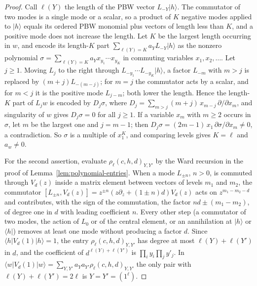 \documentclass[twoside,10pt]{article}
\numberwithin{equation}{section}
\theoremstyle{slbody}
\theoremstyle{definition}
\theoremstyle{remark}
\begin{document}
\begin{proof}
Call \(\ell(Y)\) the length of the PBW vector \(L_{-Y}\lvert h\rangle\).
The commutator of two modes is a single mode or a scalar, so a product of
\(K\) negative modes applied to \(\lvert h\rangle\) equals its ordered PBW
monomial plus vectors of length less than \(K\), and a positive mode does
not increase the length.  Let \(K\) be the largest length occurring in
\(w\), and encode its length-\(K\) part
\(\sum_{\ell(Y)=K}a_YL_{-Y}\lvert h\rangle\) as the nonzero polynomial
\(\sigma=\sum_{\ell(Y)=K}a_Yx_{y_1}\cdots x_{y_K}\) in commuting variables
\(x_1,x_2,\ldots\).  Let \(j\geq1\).  Moving \(L_j\) to the right through
\(L_{-y_1}\cdots L_{-y_K}\lvert h\rangle\), a factor \(L_{-m}\) with \(m>j\)
is replaced by \((m+j)L_{-(m-j)}\); for \(m=j\) the commutator acts by a
scalar, and for \(m<j\) it is the positive mode \(L_{j-m}\); both lower the
length.  Hence the length-\(K\) part of \(L_jw\) is encoded by
\(D_j\sigma\), where
\(D_j=\sum_{m>j}(m+j)\,x_{m-j}\,\partial/\partial x_m\), and singularity of
\(w\) gives \(D_j\sigma=0\) for all \(j\geq1\).  If a variable \(x_m\) with
\(m\geq2\) occurs in \(\sigma\), let \(m\) be the largest one and
\(j=m-1\); then \(D_j\sigma=(2m-1)\,x_1\,\partial\sigma/\partial x_m\neq0\),
a contradiction.  So \(\sigma\) is a multiple of \(x_1^K\), and comparing
levels gives \(K=\ell\) and \(a_w\neq0\).

For the second assertion, evaluate \(\rho_\ell(c,h,d)_{Y,Y'}\) by the Ward
recursion in the proof of Lemma~\ref{lem:polynomial-entries}.  When a mode
\(L_{\pm n}\), \(n>0\), is commuted through \(V_d(z)\) inside a matrix
element between vectors of levels \(m_1\) and \(m_2\), the commutator
\([L_{\pm n},V_d(z)]=z^{\pm n}(z\partial_z+(1\pm n)d)V_d(z)\) acts on
\(z^{m_1-m_2-d}\) and contributes, with the sign of the commutation, the
factor \(nd\pm(m_1-m_2)\), of degree one in \(d\) with leading coefficient
\(n\).  Every other step (a commutator of two modes, the action of \(L_0\)
or of the central element, or an annihilation at \(\lvert h\rangle\) or
\(\langle h|\)) removes at least one mode without producing a factor
\(d\).  Since \(\langle h|V_d(1)|h\rangle=1\), the entry
\(\rho_\ell(c,h,d)_{Y,Y'}\) has degree at most \(\ell(Y)+\ell(Y')\) in
\(d\), and the coefficient of \(d^{\ell(Y)+\ell(Y')}\) is
\(\prod_iy_i\prod_jy'_j\).  In
\(\langle w|V_d(1)|w\rangle=\sum_{Y,Y'}a_Ya_{Y'}\rho_\ell(c,h,d)_{Y,Y'}\)
the only pair with \(\ell(Y)+\ell(Y')=2\ell\) is \(Y=Y'=(1^\ell)\).
\end{proof}
\end{document}
